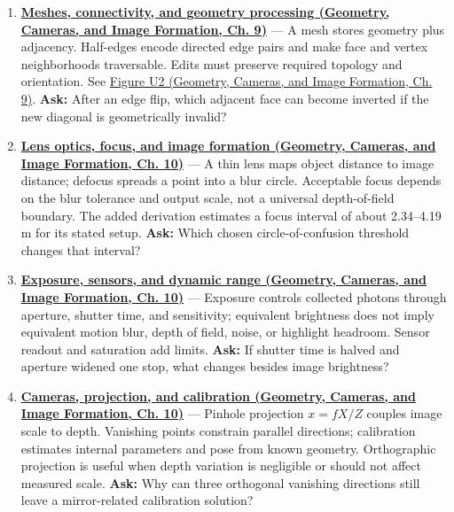 \begin{enumerate}
\item
  \textbf{\href{../03-Geometry-Cameras-and-Image-Formation/main.pdf\#nameddest=03-visual-computing-i-ch002-meshes-connectivity-and-geometry-processing}{Meshes, connectivity, and geometry processing (Geometry, Cameras, and Image Formation, Ch. 9)}} --- A mesh stores geometry plus adjacency. Half-edges encode directed edge pairs and make face and vertex neighborhoods traversable. Edits must preserve required topology and orientation. See \href{../03-Geometry-Cameras-and-Image-Formation/main.pdf\#nameddest=03-visual-computing-i-ch002-figure-u2---a-half-edge-separates-face-traversal-from-edge-traversal}{Figure U2 (Geometry, Cameras, and Image Formation, Ch. 9)}. \textbf{Ask:} After an edge flip, which adjacent face can become inverted if the new diagonal is geometrically invalid?
\item
  \textbf{\href{../03-Geometry-Cameras-and-Image-Formation/main.pdf\#nameddest=03-visual-computing-i-ch003-lens-optics-focus-and-image-formation}{Lens optics, focus, and image formation (Geometry, Cameras, and Image Formation, Ch. 10)}} --- A thin lens maps object distance to image distance; defocus spreads a point into a blur circle. Acceptable focus depends on the blur tolerance and output scale, not a universal depth-of-field boundary. The added derivation estimates a focus interval of about 2.34--4.19 m for its stated setup. \textbf{Ask:} Which chosen circle-of-confusion threshold changes that interval?
\item
  \textbf{\href{../03-Geometry-Cameras-and-Image-Formation/main.pdf\#nameddest=03-visual-computing-i-ch003-exposure-sensors-and-dynamic-range}{Exposure, sensors, and dynamic range (Geometry, Cameras, and Image Formation, Ch. 10)}} --- Exposure controls collected photons through aperture, shutter time, and sensitivity; equivalent brightness does not imply equivalent motion blur, depth of field, noise, or highlight headroom. Sensor readout and saturation add limits. \textbf{Ask:} If shutter time is halved and aperture widened one stop, what changes besides image brightness?
\item
  \textbf{\href{../03-Geometry-Cameras-and-Image-Formation/main.pdf\#nameddest=03-visual-computing-i-ch003-cameras-projection-and-calibration}{Cameras, projection, and calibration (Geometry, Cameras, and Image Formation, Ch. 10)}} --- Pinhole projection \(x=fX/Z\) couples image scale to depth. Vanishing points constrain parallel directions; calibration estimates internal parameters and pose from known geometry. Orthographic projection is useful when depth variation is negligible or should not affect measured scale. \textbf{Ask:} Why can three orthogonal vanishing directions still leave a mirror-related calibration solution?

\end{enumerate}

